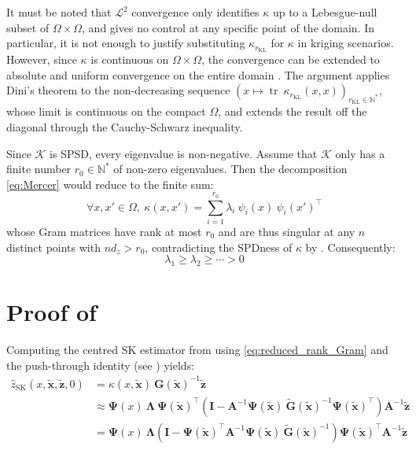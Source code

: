 It must be noted that $\mathcal{L}^2$ convergence only identifies $\kappa$ up to a Lebesgue-null subset of $\Omega\times\Omega$, and gives no control at any specific point of the domain. In particular, it is not enough to justify substituting $\kappa_{r_{\mathrm{KL}}}$ for $\kappa$ in kriging scenarios. However, since $\kappa$ is continuous on $\Omega\times\Omega$, the convergence can be extended to absolute and uniform convergence on the entire domain \cite{bib:Karhunen-Loeve}. The argument applies Dini's theorem \cite{bib:Dini} to the non-decreasing sequence $\left(x\mapsto\operatorname{tr}\:\kappa_{r_{\mathrm{KL}}}(x,x)\right)_{r_{\mathrm{KL}}\in\mathbb{N}^*}$, whose limit is continuous on the compact $\Omega$, and extends the result off the diagonal through the Cauchy-Schwarz inequality.

Since $\mathcal{K}$ is SPSD, every eigenvalue is non-negative. Assume that $\mathcal{K}$ only has a finite number $r_0\in\mathbb{N}^*$ of non-zero eigenvalues. Then the decomposition \eqref{eq:Mercer} would reduce to the finite sum:
\begin{equation}
	\forall x,x'\in\Omega,\:\kappa(x,x')=\sum_{i=1}^{r_0}\lambda_i\:\psi_i(x)\:\psi_i(x')^\top
\end{equation}
whose Gram matrices have rank at most $r_0$ and are thus singular at any $n$ distinct points with $nd_z>r_0$, contradicting the SPDness of $\kappa$ by . Consequently:
\begin{equation}
	\lambda_1\geq\lambda_2\geq\cdots>0
\end{equation}

\section[Proof of Proposition 3.18]{Proof of }\label{sec:proof_reduced_rank_kriging}

Computing the centred SK estimator from  using \eqref{eq:reduced_rank_Gram} and the push-through identity (see ) yields:
\begin{equation}
	\begin{aligned}
	\hat{z}_{\mathrm{SK}}(x,\tilde{\mathbf{x}},\tilde{\mathbf{z}},0)&=\kappa(x,\tilde{\mathbf{x}})\:\mathbf{G}(\tilde{\mathbf{x}})^{-1}\tilde{\mathbf{z}}\\
	&\approx\boldsymbol{\Psi}(x)\:\boldsymbol{\Lambda}\:\boldsymbol{\Psi}(\tilde{\mathbf{x}})^\top\left(\mathbf{I}-\mathbf{A}^{-1}\boldsymbol{\Psi}(\tilde{\mathbf{x}})\:\tilde{\mathbf{G}}(\tilde{\mathbf{x}})^{-1}\boldsymbol{\Psi}(\tilde{\mathbf{x}})^\top\right)\mathbf{A}^{-1}\tilde{\mathbf{z}}\\
	&=\boldsymbol{\Psi}(x)\:\boldsymbol{\Lambda}\left(\mathbf{I}-\boldsymbol{\Psi}(\tilde{\mathbf{x}})^\top \mathbf{A}^{-1}\boldsymbol{\Psi}(\tilde{\mathbf{x}})\:\tilde{\mathbf{G}}(\tilde{\mathbf{x}})^{-1}\right)\boldsymbol{\Psi}(\tilde{\mathbf{x}})^\top \mathbf{A}^{-1}\tilde{\mathbf{z}}
	\end{aligned}\label{eq:z_s_up_to_tilde_G}
\end{equation}

